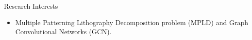 
\begin{rSection}{Research Interests}
\begin{itemize}
    \item Multiple Patterning Lithography Decomposition problem (MPLD) and Graph Convolutional Networks (GCN).
\end{itemize}
\end{rSection}




